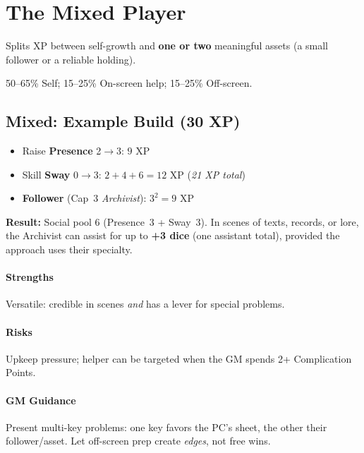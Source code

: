 \documentclass[12pt]{book}
\begin{document}

\section{The Mixed Player}
\begin{description}[leftmargin=2cm]
  \item[Definition:] Splits XP between self-growth and \textbf{one or two} meaningful assets (a small follower or a reliable holding).
  \item[Typical XP Spread:] 50--65\% Self; 15--25\% On-screen help; 15--25\% Off-screen.
\end{description}

\subsection*{Mixed: Example Build (30 XP)}
\begin{itemize}
  \item Raise \textbf{Presence} 2$\rightarrow$3: $9$ XP
  \item Skill \textbf{Sway} 0$\rightarrow$3: $2+4+6=12$ XP \hfill (\emph{21 XP total})
  \item \textbf{Follower} (Cap~3 \emph{Archivist}): $3^2=9$ XP
\end{itemize}

\textbf{Result:} Social pool 6 (Presence~3 + Sway~3).  
In scenes of texts, records, or lore, the Archivist can assist for up to \textbf{+3 dice} (one assistant total), provided the approach uses their specialty.

\paragraph{Strengths} Versatile: credible in scenes \emph{and} has a lever for special problems.  
\paragraph{Risks} Upkeep pressure; helper can be targeted when the GM spends 2+ Complication Points.  
\paragraph{GM Guidance} Present multi-key problems: one key favors the PC’s sheet, the other their follower/asset. Let off-screen prep create \emph{edges}, not free wins.

\end{document}
